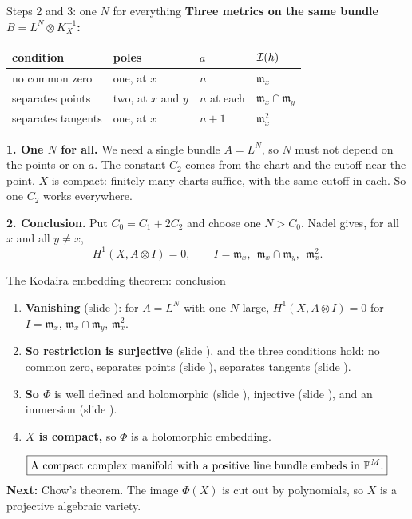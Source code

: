 \begin{frame}{Steps 2 and 3: one \(N\) for everything}
\label{fr:one-N}
\textbf{Three metrics on the same bundle \(B=L^N\otimes K_X^{-1}\):}
\begin{center}
\renewcommand{\arraystretch}{1.15}
\begin{tabular}{@{}llll@{}}
\hline
condition & poles & \(a\) & \(\mathcal I(h)\)\\
\hline
no common zero & one, at \(x\) & \(n\) & \(\mathfrak m_x\)\\
separates points & two, at \(x\) and \(y\) & \(n\) at each & \(\mathfrak m_x\cap\mathfrak m_y\)\\
separates tangents & one, at \(x\) & \(n+1\) & \(\mathfrak m_x^2\)\\
\hline
\end{tabular}
\end{center}
\textbf{1. One \(N\) for all.} We need a single bundle \(A=L^N\), so \(N\) must not depend on the points or on \(a\). The constant \(C_2\) comes from the chart and the cutoff near the point. \(X\) is compact: finitely many charts suffice, with the same cutoff in each. So one \(C_2\) works everywhere.
\par\medskip
\textbf{2. Conclusion.} Put \(C_0=C_1+2C_2\) and choose one \(N>C_0\). Nadel gives, for all \(x\) and all \(y\ne x\),
\[
\boxed{H^1(X,A\otimes I)=0,\qquad I=\mathfrak m_x,\ \ \mathfrak m_x\cap\mathfrak m_y,\ \ \mathfrak m_x^2 .}
\]
\end{frame}



\begin{frame}{The Kodaira embedding theorem: conclusion}
\label{fr:conclusion}
\begin{enumerate}
\setlength{\itemsep}{6pt}
\item \textbf{Vanishing} (slide \hyperlink{fr:one-N}{\pageref{fr:one-N}}): for \(A=L^N\) with one \(N\) large, \(H^1(X,A\otimes I)=0\) for \(I=\mathfrak m_x\), \(\mathfrak m_x\cap\mathfrak m_y\), \(\mathfrak m_x^2\).
\item \textbf{So restriction is surjective} (slide \hyperlink{fr:plan}{\pageref{fr:plan}}), and the three conditions hold: no common zero, separates points (slide \hyperlink{fr:surj-points}{\pageref{fr:surj-points}}), separates tangents (slide \hyperlink{fr:surj-tangents}{\pageref{fr:surj-tangents}}).
\item \textbf{So \(\Phi\)} is well defined and holomorphic (slide \hyperlink{fr:goal-sections}{\pageref{fr:goal-sections}}), injective (slide \hyperlink{fr:prov-injective}{\pageref{fr:prov-injective}}), and an immersion (slide \hyperlink{fr:immersion}{\pageref{fr:immersion}}).
\item \textbf{\(X\) is compact,} so \(\Phi\) is a holomorphic embedding.
\end{enumerate}
\[
\boxed{\text{A compact complex manifold with a positive line bundle embeds in } \mathbb P^M.}
\]
\textbf{Next:} Chow's theorem. The image \(\Phi(X)\) is cut out by polynomials, so \(X\) is a projective algebraic variety.
\end{frame}


